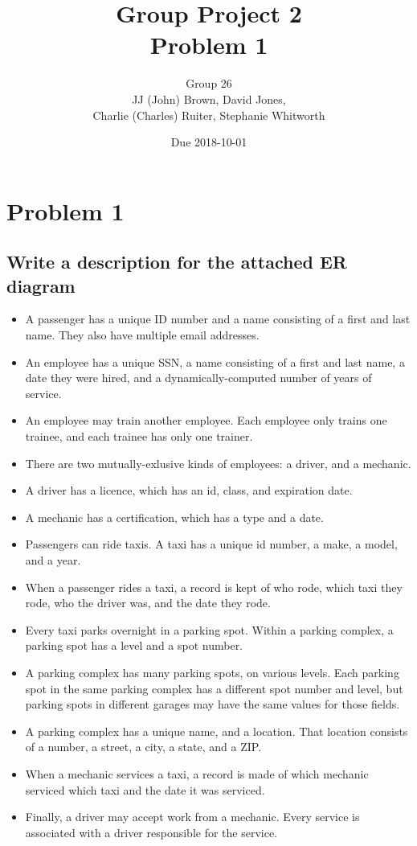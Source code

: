 \documentclass{article}
\title{Group Project 2\\Problem 1}
\author{Group 26\\JJ (John) Brown, David Jones,\\Charlie (Charles) Ruiter, Stephanie Whitworth}
\date{Due 2018-10-01}
\begin{document}
\maketitle

\section{Problem 1}
\subsection{Write a description for the attached ER diagram}

\begin{itemize}
\item A passenger has a unique ID number and a name consisting of a first and last name. They also have multiple email addresses.
\item An employee has a unique SSN, a name consisting of a first and last name, a date they were hired, and a dynamically-computed number of years of service.
\item An employee may train another employee. Each employee only trains one trainee, and each trainee has only one trainer.
\item There are two mutually-exlusive kinds of employees: a driver, and a mechanic.
\item A driver has a licence, which has an id, class, and expiration date.
\item A mechanic has a certification, which has a type and a date.
\item Passengers can ride taxis. A taxi has a unique id number, a make, a model, and a year.
\item When a passenger rides a taxi, a record is kept of who rode, which taxi they rode, who the driver was, and the date they rode.
\item Every taxi parks overnight in a parking spot. Within a parking complex, a parking spot has a level and a spot number.
\item A parking complex has many parking spots, on various levels. Each parking spot in the same parking complex has a different spot number and level, but parking spots in different garages may have the same values for those fields.
\item A parking complex has a unique name, and a location. That location consists of a number, a street, a city, a state, and a ZIP.
\item When a mechanic services a taxi, a record is made of which mechanic serviced which taxi and the date it was serviced.
\item Finally, a driver may accept work from a mechanic. Every service is associated with a driver responsible for the service.
\end{itemize}
\end{document}
